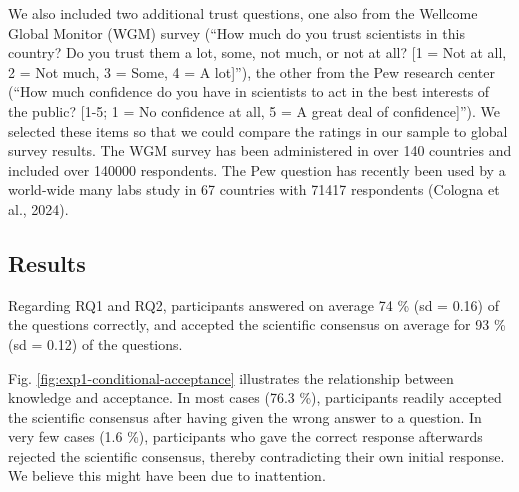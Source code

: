 \documentclass[
  doc,floatsintext]{apa6}
\begin{document}
We also included two additional trust questions, one also from the Wellcome Global Monitor (WGM) survey (``How much do you trust scientists in this country? Do you trust them a lot, some, not much, or not at all? {[}1 = Not at all, 2 = Not much, 3 = Some, 4 = A lot{]}''), the other from the Pew research center (``How much confidence do you have in scientists to act in the best interests of the public? {[}1-5; 1 = No confidence at all, 5 = A great deal of confidence{]}''). We selected these items so that we could compare the ratings in our sample to global survey results. The WGM survey has been administered in over 140 countries and included over 140000 respondents. The Pew question has recently been used by a world-wide many labs study in 67 countries with 71417 respondents (Cologna et al., 2024).

\hypertarget{results}{%
\subsection{Results}\label{results}}

Regarding RQ1 and RQ2, participants answered on average 74 \% (sd = 0.16) of the questions correctly, and accepted the scientific consensus on average for 93 \% (sd = 0.12) of the questions.

Fig. \ref{fig:exp1-conditional-acceptance} illustrates the relationship between knowledge and acceptance. In most cases (76.3 \%), participants readily accepted the scientific consensus after having given the wrong answer to a question. In very few cases (1.6 \%), participants who gave the correct response afterwards rejected the scientific consensus, thereby contradicting their own initial response. We believe this might have been due to inattention.
\end{document}
